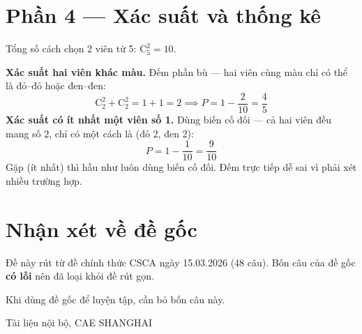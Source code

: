 \documentclass[11pt, a4paper]{article}
\begin{document}
\section{Phần 4 — Xác suất và thống kê}

\begin{dapan}[20 — Đáp án D]
Tổng số cách chọn 2 viên từ 5: $\mathrm{C}_5^2=10$.

\textbf{Xác suất hai viên khác màu.} Đếm phần bù — hai viên cùng màu chỉ có thể là đỏ–đỏ hoặc đen–đen:
\[
\mathrm{C}_2^2+\mathrm{C}_2^2=1+1=2 \implies P=1-\frac{2}{10}=\frac{4}{5}
\]
\textbf{Xác suất có ít nhất một viên số 1.} Dùng biến cố đối — cả hai viên đều mang số 2, chỉ có một cách là (đỏ 2, đen 2):
\[
P=1-\frac{1}{10}=\frac{9}{10}
\]
 Gặp  (ít nhất) thì hầu như luôn dùng biến cố đối. Đếm trực tiếp dễ sai vì phải xét nhiều trường hợp.
\end{dapan}

\section{Nhận xét về đề gốc}

Đề này rút từ đề chính thức CSCA ngày 15.03.2026 (48 câu). Bốn câu của đề gốc \textbf{có lỗi} nên đã loại khỏi đề rút gọn.


\vspace{0.3cm}
\noindent Khi dùng đề gốc để luyện tập, cần bỏ bốn câu này.

\vspace{0.8cm}
\begin{center}
{\footnotesize\color{cae_blue} Tài liệu nội bộ, CAE SHANGHAI}
\end{center}
\end{document}
